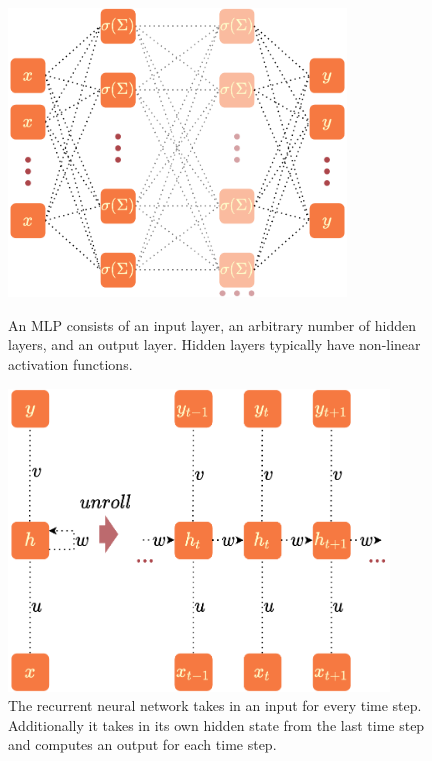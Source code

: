 \documentclass[a4paper,cleardoubleempty,BCOR1cm, 11pt]{report}
\begin{document}
\begin{figure}
	\centering
	\begin{minipage}[t]{0.45\textwidth}
		\centering
		\includegraphics[width=0.8\textwidth,height=0.21\textheight]{images/mlp.pdf} 
		\caption{An MLP consists of an input layer, an arbitrary number of hidden layers, and an output layer. Hidden layers typically have non-linear activation functions.}
	\end{minipage}\hfill
	\begin{minipage}[t]{0.45\textwidth}
		\centering
		\includegraphics[width=0.9\textwidth,height=0.20\textheight]{images/rnn.pdf}
		\caption{The recurrent neural network takes in an input for every time step. Additionally it takes in its own hidden state from the last time step and computes an output for each time step.}
		\label{fig:rnn}
	\end{minipage}
\end{figure}
\end{document}

